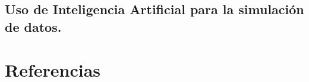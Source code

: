 \documentclass[
  spanish,
  letterpaper,
  DIV=11,
  numbers=noendperiod]{scrreprt}
\begin{document}
\section{Uso de Inteligencia Artificial para la simulación de
datos.}\label{uso-de-inteligencia-artificial-para-la-simulaciuxf3n-de-datos.}

\subsection{}\label{section}


\chapter*{Referencias}\label{referencias}

\end{document}
